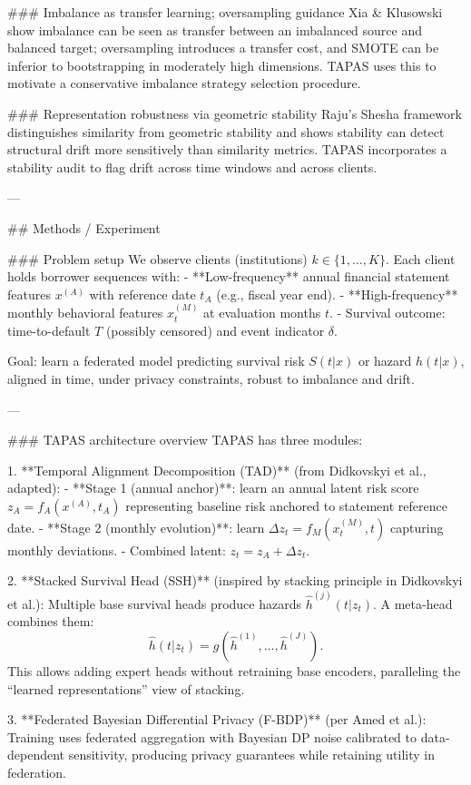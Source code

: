 ### Imbalance as transfer learning; oversampling guidance  
Xia & Klusowski show imbalance can be seen as transfer between an imbalanced source and balanced target; oversampling introduces a transfer cost, and SMOTE can be inferior to bootstrapping in moderately high dimensions. TAPAS uses this to motivate a conservative imbalance strategy selection procedure.

### Representation robustness via geometric stability  
Raju’s Shesha framework distinguishes similarity from geometric stability and shows stability can detect structural drift more sensitively than similarity metrics. TAPAS incorporates a stability audit to flag drift across time windows and across clients.

---

## Methods / Experiment  

### Problem setup  
We observe clients (institutions) \(k \in \{1,\dots,K\}\). Each client holds borrower sequences with:  
- **Low-frequency** annual financial statement features \(x^{(A)}\) with reference date \(t_A\) (e.g., fiscal year end).  
- **High-frequency** monthly behavioral features \(x^{(M)}_t\) at evaluation months \(t\).  
- Survival outcome: time-to-default \(T\) (possibly censored) and event indicator \(\delta\).

Goal: learn a federated model predicting survival risk \(S(t|x)\) or hazard \(h(t|x)\), aligned in time, under privacy constraints, robust to imbalance and drift.

---

### TAPAS architecture overview  
TAPAS has three modules:

1. **Temporal Alignment Decomposition (TAD)** (from Didkovskyi et al., adapted):  
   - **Stage 1 (annual anchor)**: learn an annual latent risk score \(z_A = f_A(x^{(A)}, t_A)\) representing baseline risk anchored to statement reference date.  
   - **Stage 2 (monthly evolution)**: learn \(\Delta z_t = f_M(x^{(M)}_t, t)\) capturing monthly deviations.  
   - Combined latent: \(z_t = z_A + \Delta z_t\).

2. **Stacked Survival Head (SSH)** (inspired by stacking principle in Didkovskyi et al.):  
   Multiple base survival heads produce hazards \(\hat h^{(j)}(t|z_t)\). A meta-head combines them:
   \[
   \hat h(t|z_t)=g(\hat h^{(1)},\ldots,\hat h^{(J)}).
   \]
   This allows adding expert heads without retraining base encoders, paralleling the “learned representations” view of stacking.

3. **Federated Bayesian Differential Privacy (F-BDP)** (per Amed et al.):  
   Training uses federated aggregation with Bayesian DP noise calibrated to data-dependent sensitivity, producing privacy guarantees while retaining utility in federation.

